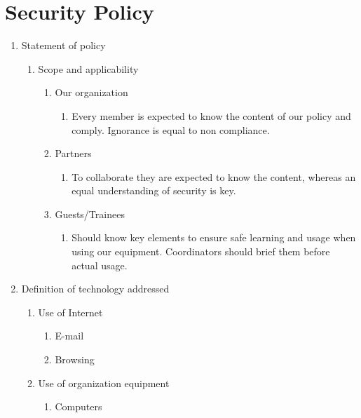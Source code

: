 \section{Security Policy}


\begin{enumerate}
  \item Statement of policy
  \begin{enumerate}
    \item Scope and applicability
    \begin{enumerate}
      \item Our organization
        \begin{enumerate}
          \item Every member is expected to know the content of our policy and comply. Ignorance is equal to non compliance.
        \end{enumerate}
          \item Partners
        \begin{enumerate}
          \item To collaborate they are expected to know the content, whereas an equal understanding of security is key.
        \end{enumerate}
          \item Guests/Trainees
        \begin{enumerate}
          \item Should know key elements to ensure safe learning and usage when using our equipment. Coordinators should brief them before actual usage.
        \end{enumerate}
    \end{enumerate}
  \end{enumerate}
  \item Definition of technology addressed
  \begin{enumerate}
    \item Use of Internet
    \begin{enumerate}   
      \item E-mail
      \item Browsing
    \end{enumerate}
    \item Use of organization equipment
    \begin{enumerate}
      \item Computers

\end{enumerate}
\end{enumerate}
\end{enumerate}
